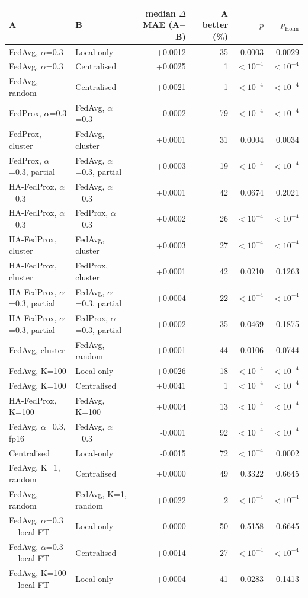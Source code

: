 \begin{tabular}{llrrrr}
\toprule
A & B & median $\Delta$MAE (A$-$B) & A better (\%) & $p$ & $p_{\mathrm{Holm}}$ \\
\midrule
FedAvg, $\alpha$=0.3 & Local-only & +0.0012 & 35 & 0.0003 & 0.0029 \\
FedAvg, $\alpha$=0.3 & Centralised & +0.0025 & 1 & $<10^{-4}$ & $<10^{-4}$ \\
FedAvg, random & Centralised & +0.0021 & 1 & $<10^{-4}$ & $<10^{-4}$ \\
FedProx, $\alpha$=0.3 & FedAvg, $\alpha$=0.3 & -0.0002 & 79 & $<10^{-4}$ & $<10^{-4}$ \\
FedProx, cluster & FedAvg, cluster & +0.0001 & 31 & 0.0004 & 0.0034 \\
FedProx, $\alpha$=0.3, partial & FedAvg, $\alpha$=0.3, partial & +0.0003 & 19 & $<10^{-4}$ & $<10^{-4}$ \\
HA-FedProx, $\alpha$=0.3 & FedAvg, $\alpha$=0.3 & +0.0001 & 42 & 0.0674 & 0.2021 \\
HA-FedProx, $\alpha$=0.3 & FedProx, $\alpha$=0.3 & +0.0002 & 26 & $<10^{-4}$ & $<10^{-4}$ \\
HA-FedProx, cluster & FedAvg, cluster & +0.0003 & 27 & $<10^{-4}$ & $<10^{-4}$ \\
HA-FedProx, cluster & FedProx, cluster & +0.0001 & 42 & 0.0210 & 0.1263 \\
HA-FedProx, $\alpha$=0.3, partial & FedAvg, $\alpha$=0.3, partial & +0.0004 & 22 & $<10^{-4}$ & $<10^{-4}$ \\
HA-FedProx, $\alpha$=0.3, partial & FedProx, $\alpha$=0.3, partial & +0.0002 & 35 & 0.0469 & 0.1875 \\
FedAvg, cluster & FedAvg, random & +0.0001 & 44 & 0.0106 & 0.0744 \\
FedAvg, K=100 & Local-only & +0.0026 & 18 & $<10^{-4}$ & $<10^{-4}$ \\
FedAvg, K=100 & Centralised & +0.0041 & 1 & $<10^{-4}$ & $<10^{-4}$ \\
HA-FedProx, K=100 & FedAvg, K=100 & +0.0004 & 13 & $<10^{-4}$ & $<10^{-4}$ \\
FedAvg, $\alpha$=0.3, fp16 & FedAvg, $\alpha$=0.3 & -0.0001 & 92 & $<10^{-4}$ & $<10^{-4}$ \\
Centralised & Local-only & -0.0015 & 72 & $<10^{-4}$ & 0.0002 \\
FedAvg, K=1, random & Centralised & +0.0000 & 49 & 0.3322 & 0.6645 \\
FedAvg, random & FedAvg, K=1, random & +0.0022 & 2 & $<10^{-4}$ & $<10^{-4}$ \\
FedAvg, $\alpha$=0.3 + local FT & Local-only & -0.0000 & 50 & 0.5158 & 0.6645 \\
FedAvg, $\alpha$=0.3 + local FT & Centralised & +0.0014 & 27 & $<10^{-4}$ & $<10^{-4}$ \\
FedAvg, K=100 + local FT & Local-only & +0.0004 & 41 & 0.0283 & 0.1413 \\
\bottomrule
\end{tabular}
